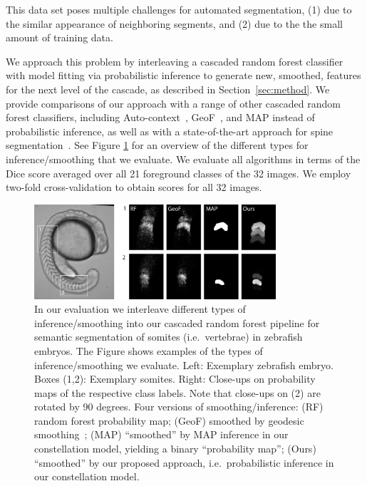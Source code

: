 \documentclass[10pt,twocolumn,letterpaper]{article}
\begin{document}
This data set poses multiple challenges for automated segmentation, (1) due to the similar appearance of neighboring segments, and (2) due to the the small amount of training data.

We approach this problem by interleaving a cascaded random forest classifier with model fitting via probabilistic inference to generate new, smoothed, features for the next level of the cascade, as described in Section~\ref{sec:method}. 
%
We provide comparisons of our approach with a range of other cascaded random forest classifiers, including Auto-context~\cite{AutoContext2008}, GeoF~\cite{GeoForests2013}, and MAP instead of probabilistic inference, as well as with a state-of-the-art approach for spine segmentation~\cite{Glocker2013}.  See Figure \ref{fig:smoothing} for an overview of the different types for inference/smoothing that we evaluate.  We evaluate all algorithms in terms of the Dice score averaged over all 21 foreground classes of the 32 images. We employ two-fold cross-validation to obtain scores for all 32 images.

\begin{figure}[t]
\begin{center}
\includegraphics[width=0.8\textwidth]{smoothing.jpg} %
\caption{In our evaluation we interleave different types of inference/smoothing into our cascaded random forest pipeline for semantic segmentation of somites (i.e.\ vertebrae) in zebrafish embryos. 
%
The Figure shows examples of the types of inference/smoothing we evaluate. 
Left: Exemplary zebrafish embryo. Boxes (1,2): Exemplary somites. Right: Close-ups on probability maps of the respective class labels. Note that close-ups on (2) are rotated by 90 degrees. 
%
Four versions of smoothing/inference: (RF) random forest probability map; (GeoF) smoothed by geodesic smoothing~\cite{GeoForests2013}; (MAP) ``smoothed'' by MAP inference in our constellation model, yielding a binary ``probability map''; 
%
(Ours) ``smoothed'' by our proposed approach, i.e.\ probabilistic inference in our constellation model.  }
\label{fig:smoothing}
\end{center}
\end{figure}
%
\end{document}
